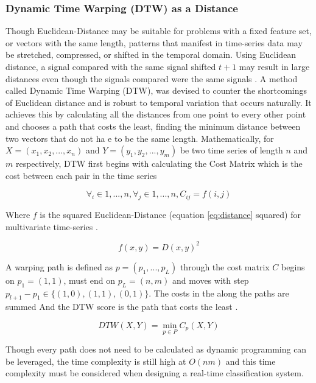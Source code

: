 \subsubsection{Dynamic Time Warping (DTW) as a Distance}
Though Euclidean-Distance may be suitable for problems with a fixed feature set, or vectors with the same length, patterns that manifest in time-series data may be stretched, compressed, or shifted in the temporal domain. Using Euclidean distance, a signal compared with the same signal shifted $t+1$ may result in large distances even though the signals compared were the same signals \cite{faouziTimeSeriesClassification2024}. A method called Dynamic Time Warping (DTW), was devised to counter the shortcomings of Euclidean distance and is robust to temporal variation that occurs naturally. It achieves this by calculating all the distances from one point to every other point and chooses a path that costs the least, finding the minimum distance between two vectors that do not ha e to be the same length. Mathematically, for $X = (x_1, x_2, ..., x_n)$ and $Y = (y_1, y_2, ..., y_m)$ be two time series of length $n$ and $m$ respectively, DTW first begins with calculating the Cost Matrix which is the cost between each pair in the time series \cite{faouziTimeSeriesClassification2024}  

\begin{equation}
    \forall_i \in {1,...,n}, \forall_j \in {1,...,n}, C_{ij} = f(i, j) 
\end{equation}

Where $f$ is the squared Euclidean-Distance (equation \ref{eq:distance} squared) for multivariate time-series \cite{faouziTimeSeriesClassification2024}.

\begin{equation}
    f(x, y) = D(x, y)^2
\end{equation}

A warping path is defined as $p = (p_1, ..., p_L)$ through the cost matrix $C$ begins on $p_1 = (1,1)$, must end on $p_L = (n, m)$ and moves with step $p_{l+1} - p_1 \in \{(1,0), (1,1), (0,1)\}$. The costs in the along the paths are summed And the DTW score is the path that costs the least \cite{faouziTimeSeriesClassification2024}.

\begin{equation}
    DTW(X, Y) = \min_{p \in P} C_p(X, Y) 
\end{equation}

Though every path does not need to be calculated as dynamic programming can be leveraged, the time complexity is still high at $O(nm)$ \cite{faouziTimeSeriesClassification2024} and this time complexity must be considered when designing a real-time classification system.

